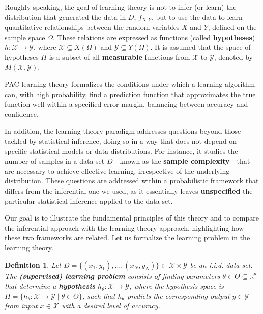 \documentclass{report}
\newtheorem{definition}{Definition}[chapter]
\begin{document}
Roughly speaking, the goal of learning theory is not to infer (or learn) the distribution that generated the data in $D$, $f_{X,Y}$, but to use the data to learn quantitative relationships between the random variables $X$ and $Y$, defined on the sample space $\Omega$. These relations are expressed as functions (called \textbf{hypotheses}) $h : \mathcal{X} \to \mathcal{Y}$, where $\mathcal{X} \subseteq X(\Omega)$ and $\mathcal{Y} \subseteq Y(\Omega)$. It is assumed that the space of hypotheses $H$ is a subset of all \textbf{measurable} functions from $\mathcal{X}$ to $\mathcal{Y}$, denoted by $M(\mathcal{X}, \mathcal{Y})$.

PAC learning theory formalizes the conditions under which a learning algorithm can, with high probability, find a prediction function that approximates the true  function well within a specified error margin, balancing between accuracy and confidence.

In addition, the learning theory paradigm addresses questions beyond those tackled by statistical inference, doing so in a way that does not depend on specific statistical models or data distributions. For instance, it studies the number of samples in a data set $D$—known as the \textbf{sample complexity}—that are necessary to achieve effective learning, irrespective of the underlying distribution. These questions are addressed within a probabilistic framework that differs from the inferential one we used, as it essentially leaves \textbf{unspecified} the particular statistical inference applied to the data set.

Our goal is to illustrate the fundamental principles of this theory and to compare the inferential approach with the learning theory approach, highlighting how these two frameworks are related. Let us formalize the learning problem in the learning theory.

\begin{definition}
Let $D = \{(x_1,y_1), \dots, (x_N,y_N)\} \subset \mathcal{X} \times \mathcal{Y}$ be an i.i.d. data set. The \textbf{(supervised) learning problem} consists of finding parameters $\theta \in \Theta \subseteq \mathbb{R}^d$ that determine a \textbf{hypothesis} $h_\theta : \mathcal{X} \to \mathcal{Y}$, where the hypothesis space is $H = \{ h_\theta : \mathcal{X} \to \mathcal{Y} \mid \theta \in \Theta \}$, such that $h_\theta$ predicts the corresponding output $y \in \mathcal{Y}$ from input $x \in \mathcal{X}$ with a desired level of accuracy.
\end{definition}
\end{document}
